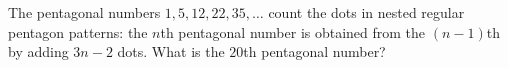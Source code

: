 The pentagonal numbers $1,5,12,22,35,\dots$ count the dots in nested regular pentagon patterns: the $n$th pentagonal number is obtained from the $(n-1)$th by adding $3n-2$ dots. What is the $20$th pentagonal number?
